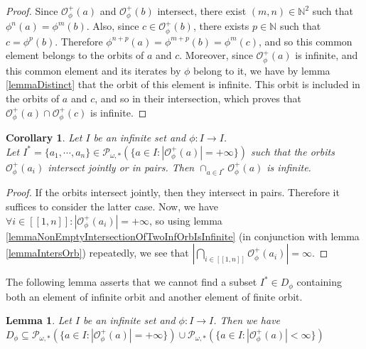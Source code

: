\documentclass[a4paper,11pt]{article}
\theoremstyle{plain}
\newtheorem{corollary}{Corollary}[section]
\newtheorem{lemma}{Lemma}[section]
\theoremstyle{definition}
\theoremstyle{remark}
\begin{document}
\begin{proof}
Since $\mathcal{O}^{+}_\phi(a)$ and $\mathcal{O}^{+}_\phi(b)$ intersect, there exist $(m,n) \in \mathbb{N}^2$ such that $\phi^n(a) = \phi^m(b)$. Also, since $c \in \mathcal{O}^{+}_\phi(b)$, there exists $p \in \mathbb{N}$ such that $c = \phi^p(b)$. Therefore $\phi^{n+p}(a) = \phi^{m+p}(b) = \phi^m(c)$, and so this common element belongs to the orbits of $a$ and $c$.  Moreover, since $\mathcal{O}^{+}_\phi(a)$ is infinite, and this common element and its iterates by $\phi$ belong to it, we have by lemma \ref{lemmaDistinct} that the orbit of this element is infinite. This orbit is included in the orbits of $a$ and $c$, and so in their intersection, which proves that $\mathcal{O}^{+}_\phi(a) \cap \mathcal{O}^{+}_\phi(c)$ is infinite.
\end{proof}


\begin{corollary}
\label{corollaryIntersectionOfFinitelyManyOrbitsIsInfinite}
Let $I$ be an infinite set and $\phi : I \to I$. \\
Let $I^* = \{a_1,\cdots,a_n\} \in \mathcal{P}_{\omega,*}(\{a \in I : |\mathcal{O}^{+}_\phi(a)|=+\infty\})$ such that the orbits $\mathcal{O}^{+}_\phi(a_i)$ intersect jointly or in pairs. 
Then $\cap_{a \in I^*} \mathcal{O}^{+}_\phi(a)$ is infinite.
\end{corollary}

\begin{proof}
If the orbits intersect jointly, then they intersect in pairs. Therefore it suffices to consider the latter case. Now, we have $\forall i \in [\![1,n]\!] : |\mathcal{O}^{+}_\phi(a_i)| = +\infty$, so using lemma \ref{lemmaNonEmptyIntersectionOfTwoInfOrbIsInfinite} (in conjunction with lemma \ref{lemmaIntersOrb}) repeatedly, we see that $| \bigcap_{i \in [\![1,n]\!]} \mathcal{O}^{+}_\phi(a_i) | = \infty$.
\end{proof}

The following lemma asserts that we cannot find a subset $I^* \in D_\phi$ containing both an element of infinite orbit and another element of finite orbit.

\begin{lemma}
\label{lemmaInclusionOfDPhi}
Let $I$ be an infinite set and $\phi : I \to I$. Then we have \\
$D_\phi \subseteq \mathcal{P}_{\omega,*}(\{a \in I : |\mathcal{O}^{+}_\phi(a)|=+\infty\}) \cup \mathcal{P}_{\omega,*}(\{a \in I : |\mathcal{O}^{+}_\phi(a)| < \infty\}) $
\end{lemma}
\end{document}
